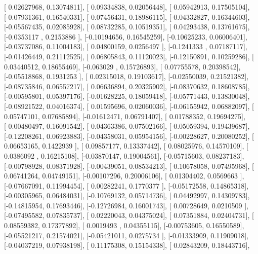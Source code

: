 \documentclass{article}
\begin{document}
       [ 0.02627968,  0.13074811],
       [ 0.09334838,  0.02056448],
       [ 0.05942913,  0.17505104],
       [-0.07931361,  0.16540331],
       [ 0.07456431,  0.18986115],
       [-0.04332827,  0.16344603],
       [-0.05567435,  0.02085928],
       [ 0.08732285,  0.10519351],
       [ 0.04293438,  0.13761675],
       [-0.0353117 ,  0.2153886 ],
       [-0.10194656,  0.16545259],
       [-0.10625233,  0.06006401],
       [-0.03737086,  0.11004183],
       [ 0.04800159,  0.0256497 ],
       [-0.1241333 ,  0.07187117],
       [-0.01426449,  0.21112525],
       [ 0.06805843,  0.11120023],
       [-0.12150891,  0.10259286],
       [ 0.03440512,  0.18655469],
       [-0.063029  ,  0.15726893],
       [ 0.07755578,  0.20398542],
       [-0.05518868,  0.1931253 ],
       [ 0.02315018,  0.19103617],
       [-0.02550039,  0.21521382],
       [-0.08735846,  0.06557217],
       [ 0.06636894,  0.20325902],
       [-0.08370632,  0.18608785],
       [-0.00595801,  0.05397176],
       [-0.01628225,  0.18059418],
       [-0.05771443,  0.13830048],
       [-0.08921522,  0.04016374],
       [ 0.01595696,  0.02060036],
       [-0.06155942,  0.06882097],
       [ 0.05747101,  0.07685894],
       [-0.01612471,  0.06791407],
       [ 0.01788352,  0.19694275],
       [-0.00480497,  0.16091542],
       [ 0.04363386,  0.07502166],
       [-0.05059394,  0.19439687],
       [-0.12208261,  0.06923883],
       [-0.04358031,  0.05954156],
       [-0.00228627,  0.20080252],
       [ 0.06653165,  0.1422939 ],
       [ 0.09857177,  0.13337442],
       [ 0.08025976,  0.14570109],
       [ 0.0386092 ,  0.16215108],
       [-0.03870147,  0.19004561],
       [-0.05715603,  0.08237183],
       [-0.00798928,  0.08371928],
       [-0.00439051,  0.08534213],
       [ 0.10678058,  0.07495968],
       [ 0.06741264,  0.04749151],
       [-0.00107296,  0.20006106],
       [ 0.01304402,  0.0569663 ],
       [-0.07667091,  0.11994454],
       [ 0.00282241,  0.1770377 ],
       [-0.05172558,  0.14865318],
       [-0.00305965,  0.06484031],
       [-0.10769132,  0.05714736],
       [ 0.04492997,  0.14309783],
       [-0.14815954,  0.17693446],
       [-0.12726984,  0.16001743],
       [ 0.00728649,  0.0210509 ],
       [-0.07495582,  0.07835737],
       [ 0.02220043,  0.04375024],
       [ 0.07351884,  0.02404731],
       [ 0.08559382,  0.17377892],
       [ 0.0019493 ,  0.04355115],
       [-0.00753605,  0.16550589],
       [-0.05521217,  0.21574021],
       [-0.05421011,  0.0275734 ],
       [-0.01333909,  0.11909018],
       [-0.04037219,  0.07938198],
       [ 0.11175308,  0.15154338],
       [ 0.02843209,  0.18443716],
\end{document}
